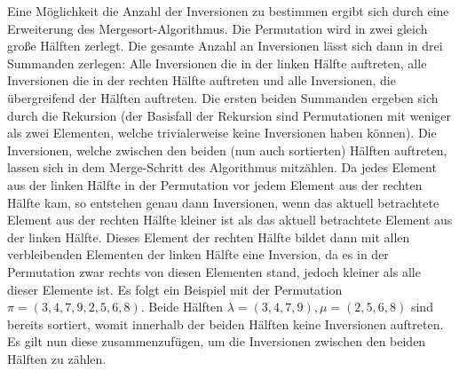 \documentclass{whswinvcbook}
\begin{document}
Eine Möglichkeit die Anzahl der Inversionen zu bestimmen ergibt sich durch eine Erweiterung des Mergesort-Algorithmus.\cite{sedge} Die Permutation wird in zwei gleich große Hälften zerlegt. Die gesamte Anzahl an Inversionen lässt sich dann in drei Summanden zerlegen: Alle Inversionen die in der linken Hälfte auftreten, alle Inversionen die in der rechten Hälfte auftreten und alle Inversionen, die übergreifend der Hälften auftreten. Die ersten beiden Summanden ergeben sich durch die Rekursion (der Basisfall der Rekursion sind Permutationen mit weniger als zwei Elementen, welche trivialerweise keine Inversionen haben können). Die Inversionen, welche zwischen den beiden (nun auch sortierten) Hälften auftreten, lassen sich in dem Merge-Schritt des Algorithmus mitzählen. Da jedes Element aus der linken Hälfte in der Permutation vor jedem Element aus der rechten Hälfte kam, so entstehen genau dann Inversionen, wenn das aktuell betrachtete Element aus der rechten Hälfte kleiner ist als das aktuell betrachtete Element aus der linken Hälfte. Dieses Element der rechten Hälfte bildet dann mit allen verbleibenden Elementen der linken Hälfte eine Inversion, da es in der Permutation zwar rechts von diesen Elementen stand, jedoch kleiner als alle dieser Elemente ist. Es folgt ein Beispiel mit der Permutation $\pi=(3,4,7,9,2,5,6,8)$. Beide Hälften $\lambda=(3,4,7,9),\mu=(2,5,6,8)$ sind bereits sortiert, womit innerhalb der beiden Hälften keine Inversionen auftreten. Es gilt nun diese zusammenzufügen, um die Inversionen zwischen den beiden Hälften zu zählen.
\end{document}

